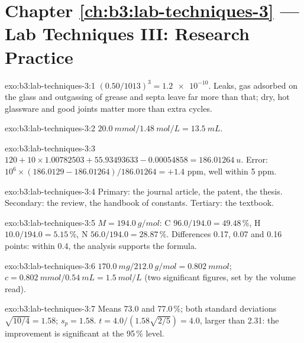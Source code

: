 \section*{Chapter \ref{ch:b3:lab-techniques-3} --- Lab Techniques III: Research Practice}

\begin{solution}{exo:b3:lab-techniques-3:1}
$(0.50/1013)^3 = \num{1.2e-10}$. Leaks, gas adsorbed on the glass and outgassing of grease and septa
leave far more than that; dry, hot glassware and good joints matter more than
extra cycles.
\end{solution}

\begin{solution}{exo:b3:lab-techniques-3:2}
$\qty{20.0}{mmol}/\qty{1.48}{mol/L} = \qty{13.5}{mL}$.
\end{solution}

\begin{solution}{exo:b3:lab-techniques-3:3}
$120 + 10 \times 1.00782503 + 55.93493633 - 0.00054858 = \qty{186.01264}{u}$. Error: $10^6 \times (186.0129 - 186.01264)/186.01264 = +1.4$ ppm,
well within 5 ppm.
\end{solution}

\begin{solution}{exo:b3:lab-techniques-3:4}
Primary: the journal article, the patent, the thesis. Secondary: the review, the
handbook of constants. Tertiary: the textbook.
\end{solution}

\begin{solution}{exo:b3:lab-techniques-3:5}
$M = \qty{194.0}{g/mol}$: C $96.0/194.0 = 49.48$\,\%, H $10.0/194.0 = 5.15$\,\%, N $56.0/194.0 = 28.87$\,\%. Differences 0.17, 0.07 and 0.16
points: within 0.4, the analysis supports the formula.
\end{solution}

\begin{solution}{exo:b3:lab-techniques-3:6}
$\qty{170.0}{mg}/\qty{212.0}{g/mol} = \qty{0.802}{mmol}$; $c = \qty{0.802}{mmol}/\qty{0.54}{mL} = \qty{1.5}{mol/L}$ (two significant figures, set by the
volume read).
\end{solution}

\begin{solution}{exo:b3:lab-techniques-3:7}
Means 73.0 and 77.0\,\%; both standard deviations $\sqrt{10/4} = 1.58$; $s_p = 1.58$. $t = 4.0/(1.58\sqrt{2/5}) = 4.0$, larger than
2.31: the improvement is significant at the 95\,\% level.
\end{solution}

